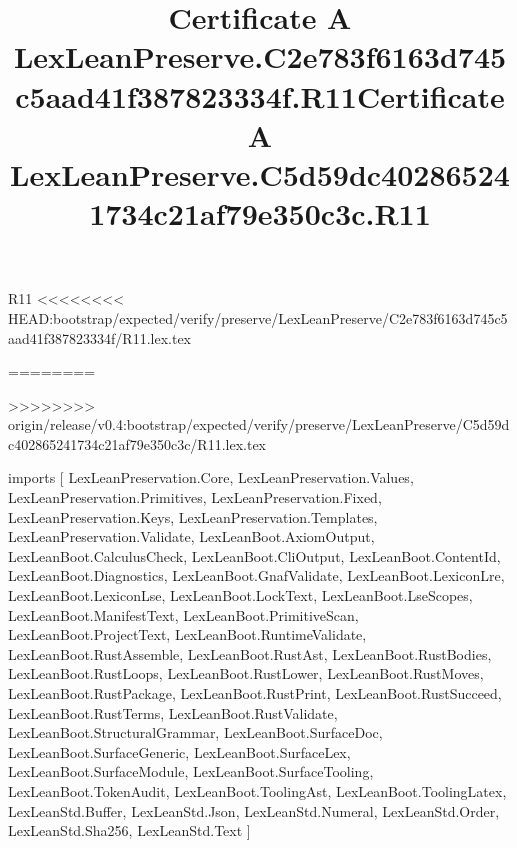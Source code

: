 \begin{lexlean}{R11}
<<<<<<<< HEAD:bootstrap/expected/verify/preserve/LexLeanPreserve/C2e783f6163d745c5aad41f387823334f/R11.lex.tex
\title{Certificate A LexLeanPreserve.C2e783f6163d745c5aad41f387823334f.R11}
========
\title{Certificate A LexLeanPreserve.C5d59dc402865241734c21af79e350c3c.R11}
>>>>>>>> origin/release/v0.4:bootstrap/expected/verify/preserve/LexLeanPreserve/C5d59dc402865241734c21af79e350c3c/R11.lex.tex
\begin{coremodule}
imports [
  LexLeanPreservation.Core,
  LexLeanPreservation.Values,
  LexLeanPreservation.Primitives,
  LexLeanPreservation.Fixed,
  LexLeanPreservation.Keys,
  LexLeanPreservation.Templates,
  LexLeanPreservation.Validate,
  LexLeanBoot.AxiomOutput,
  LexLeanBoot.CalculusCheck,
  LexLeanBoot.CliOutput,
  LexLeanBoot.ContentId,
  LexLeanBoot.Diagnostics,
  LexLeanBoot.GnafValidate,
  LexLeanBoot.LexiconLre,
  LexLeanBoot.LexiconLse,
  LexLeanBoot.LockText,
  LexLeanBoot.LseScopes,
  LexLeanBoot.ManifestText,
  LexLeanBoot.PrimitiveScan,
  LexLeanBoot.ProjectText,
  LexLeanBoot.RuntimeValidate,
  LexLeanBoot.RustAssemble,
  LexLeanBoot.RustAst,
  LexLeanBoot.RustBodies,
  LexLeanBoot.RustLoops,
  LexLeanBoot.RustLower,
  LexLeanBoot.RustMoves,
  LexLeanBoot.RustPackage,
  LexLeanBoot.RustPrint,
  LexLeanBoot.RustSucceed,
  LexLeanBoot.RustTerms,
  LexLeanBoot.RustValidate,
  LexLeanBoot.StructuralGrammar,
  LexLeanBoot.SurfaceDoc,
  LexLeanBoot.SurfaceGeneric,
  LexLeanBoot.SurfaceLex,
  LexLeanBoot.SurfaceModule,
  LexLeanBoot.SurfaceTooling,
  LexLeanBoot.TokenAudit,
  LexLeanBoot.ToolingAst,
  LexLeanBoot.ToolingLatex,
  LexLeanStd.Buffer,
  LexLeanStd.Json,
  LexLeanStd.Numeral,
  LexLeanStd.Order,
  LexLeanStd.Sha256,
  LexLeanStd.Text
]


\end{coremodule}
\end{lexlean}
